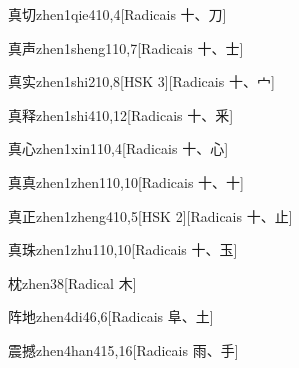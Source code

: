 \begin{entry}{真切}{zhen1qie4}{10,4}[Radicais ⼗、⼑]
\end{entry}

\begin{entry}{真声}{zhen1sheng1}{10,7}[Radicais ⼗、⼠]
\end{entry}

\begin{entry}{真实}{zhen1shi2}{10,8}[HSK 3][Radicais ⼗、⼧]
\end{entry}

\begin{entry}{真释}{zhen1shi4}{10,12}[Radicais ⼗、⾤]
\end{entry}

\begin{entry}{真心}{zhen1xin1}{10,4}[Radicais ⼗、⼼]
\end{entry}

\begin{entry}{真真}{zhen1zhen1}{10,10}[Radicais ⼗、⼗]
\end{entry}

\begin{entry}{真正}{zhen1zheng4}{10,5}[HSK 2][Radicais ⼗、⽌]
\end{entry}

\begin{entry}{真珠}{zhen1zhu1}{10,10}[Radicais ⼗、⽟]
\end{entry}

\begin{entry}{枕}{zhen3}{8}[Radical ⽊]
\end{entry}

\begin{entry}{阵地}{zhen4di4}{6,6}[Radicais ⾩、⼟]
\end{entry}

\begin{entry}{震撼}{zhen4han4}{15,16}[Radicais ⾬、⼿]
\end{entry}

